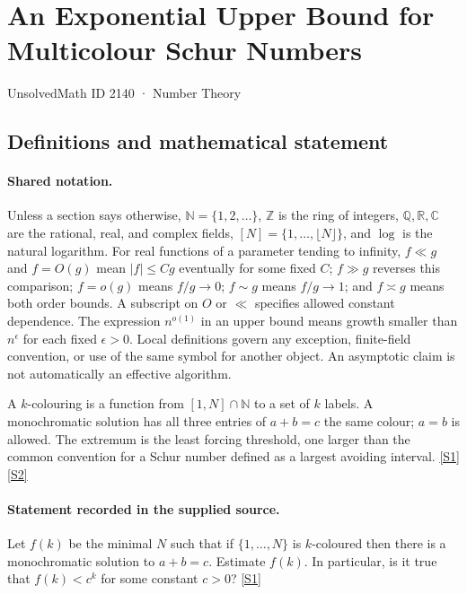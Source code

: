 \documentclass[11pt,a4paper]{article}
\newcommand{\N}{\mathbb{N}}
\newcommand{\Z}{\mathbb{Z}}
\newcommand{\Q}{\mathbb{Q}}
\newcommand{\R}{\mathbb{R}}
\newcommand{\C}{\mathbb{C}}
\newcommand{\sref}[2]{\hyperlink{source:#1:#2}{[S#2]}}
\begin{document}

\setcounter{section}{2139}

\section{An Exponential Upper Bound for Multicolour Schur Numbers}\label{2140}

{\small\sffamily UnsolvedMath ID 2140 · Number Theory}

\subsection{Definitions and mathematical statement}

\paragraph{Shared notation.}Unless a section says otherwise, $\N=\{1,2,\ldots\}$,
$\Z$ is the ring of integers, $\Q,\R,\C$ are the rational, real, and complex
fields, $[N]=\{1,\ldots,\lfloor N\rfloor\}$, and $\log$ is the natural
logarithm. For real functions of a parameter tending to infinity,
$f\ll g$ and $f=O(g)$ mean $|f|\leq Cg$ eventually for some fixed $C$;
$f\gg g$ reverses this comparison; $f=o(g)$ means $f/g\to0$;
$f\sim g$ means $f/g\to1$; and $f\asymp g$ means both order bounds.
A subscript on $O$ or $\ll$ specifies allowed constant dependence.
The expression $n^{o(1)}$ in an upper bound means growth smaller than
$n^\epsilon$ for each fixed $\epsilon>0$. Local definitions govern any
exception, finite-field convention, or use of the same symbol for another
object. An asymptotic claim is not automatically an effective algorithm.



A $k$-colouring is a function from $[1,N]\cap\N$ to a set of $k$ labels. A monochromatic solution has all three entries of $a+b=c$ the same colour; $a=b$ is allowed. The extremum is the least forcing threshold, one larger than the common convention for a Schur number defined as a largest avoiding interval. \sref{2140}{1} \sref{2140}{2}

\paragraph{Statement recorded in the supplied source.}
Let $f(k)$ be the minimal $N$ such that if $\{1,\ldots,N\}$ is $k$-coloured then there is a monochromatic solution to $a+b=c$. Estimate $f(k)$. In particular, is it true that $f(k) < c^k$ for some constant $c>0$? \sref{2140}{1}
\end{document}
